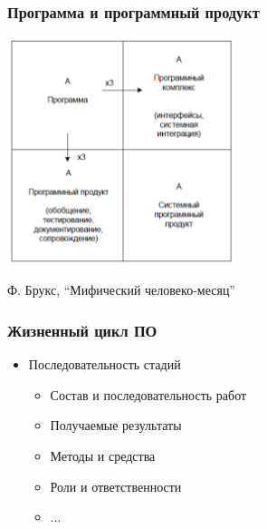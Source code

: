 \documentclass{../../slides-style}
\begin{document}
    
    \begin{frame}[plain]
        \titlepage
    \end{frame}
    
    \begin{frame}
        \frametitle{Программа и программный продукт}
        \begin{center}
            \includegraphics[width=0.5\textwidth]{mythical-man-month.png}
        \end{center}
        \begin{center}
            Ф. Брукс, ``Мифический человеко-месяц''
        \end{center}
    \end{frame}

    \begin{frame}
        \frametitle{Жизненный цикл ПО}
        \begin{itemize}
            \item Последовательность стадий
            \begin{itemize}
                \item Состав и последовательность работ
                \item Получаемые результаты
                \item Методы и средства
                \item Роли и ответственности
                \item ...
            \end{itemize}
        \end{itemize}
    \end{frame}
\end{document}
